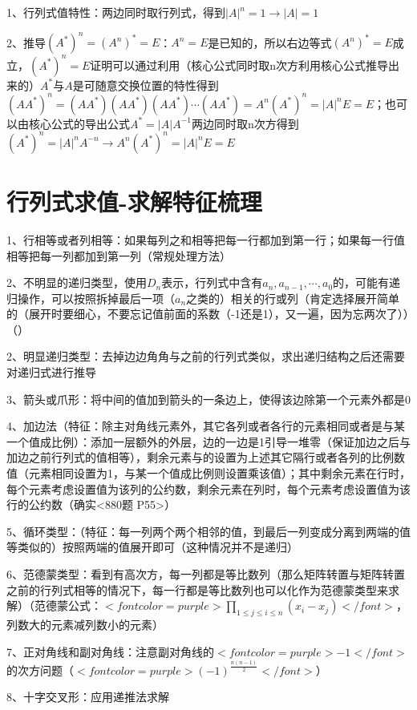 1、行列式值特性：两边同时取行列式，得到$ |A|^n=1 \rightarrow |A|=1 $

2、推导$ (A^*)^n=(A^n)^*=E $：$ A^n=E $是已知的，所以右边等式$ (A^n)^*=E $成立，$ (A^*)^n=E $证明可以通过利用（核心公式同时取n次方利用核心公式推导出来的）$ A^* $与$ A $是可随意交换位置的特性得到$ (AA^*)^n=(AA^*)(AA^*)(AA^*)\cdots(AA^*)=A^n(A^*)^n=|A|^nE=E $；也可以由核心公式的导出公式$ A^*=|A|A^{-1} $两边同时取n次方得到$ (A^*)^n=|A|^nA^{-n} \rightarrow A^n(A^*)^n=|A|^nE=E $

\section{行列式求值-求解特征梳理}

1、行相等或者列相等：如果每列之和相等把每一行都加到第一行；如果每一行值相等把每一列都加到第一列（常规处理方法）

2、不明显的递归类型，使用$ D_n $表示，行列式中含有$ a_n,a_{n-1},\cdots,a_0 $的，可能有递归操作，可以按照拆掉最后一项（$ a_n $之类的）相关的行或列（肯定选择展开简单的（展开时要细心，不要忘记值前面的系数（-1还是1），又一遍，因为忘两次了））（）

2、明显递归类型：去掉边边角角与之前的行列式类似，求出递归结构之后还需要对递归式进行推导

3、箭头或爪形：将中间的值加到箭头的一条边上，使得该边除第一个元素外都是0

4、加边法（特征：除主对角线元素外，其它各列或者各行的元素相同或者是与某一个值成比例）：添加一层额外的外层，边的一边是1引导一堆零（保证加边之后与加边之前行列式的值相等），剩余元素与的设置为上述其它隔行或者各列的比例数值（元素相同设置为1，与某一个值成比例则设置乘该值）；其中剩余元素在行时，每个元素考虑设置值为该列的公约数，剩余元素在列时，每个元素考虑设置值为该行的公约数（确实<880题 P55>）

5、循环类型：（特征：每一列两个两个相邻的值，到最后一列变成分离到两端的值等类似的）按照两端的值展开即可（这种情况并不是递归）

6、范德蒙类型：看到有高次方，每一列都是等比数列（那么矩阵转置与矩阵转置之前的行列式相等的情况下，每一行都是等比数列也可以化作为范德蒙类型来求解）（范德蒙公式：$ <font color=purple>\prod_{1\le j \le i \le n}(x_i-x_j)</font> $，列数大的元素减列数小的元素）

7、正对角线和副对角线：注意副对角线的$ <font color=purple>-1</font> $的次方问题（$ <font color=purple>(-1)^{\frac {n(n-1)}{2}}</font> $）

8、十字交叉形：应用递推法求解

